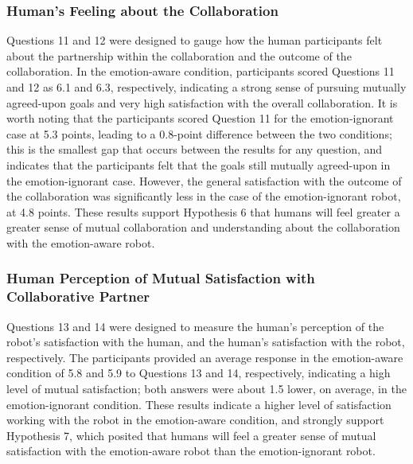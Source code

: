 \documentclass{sig-alternate-05-2015}
\begin{document}
\subsubsection{Human's Feeling about the Collaboration}
\label{sec:Collaboration}
Questions 11 and 12 were designed to gauge how the human participants felt
about the partnership within the collaboration and the outcome of the
collaboration. In the emotion-aware condition, participants scored Questions 11
and 12 as 6.1 and 6.3, respectively, indicating a strong sense of pursuing
mutually agreed-upon goals and very high satisfaction with the overall
collaboration. It is worth noting that the participants scored Question 11 for
the emotion-ignorant case at 5.3 points, leading to a 0.8-point difference
between the two conditions; this is the smallest gap that occurs between the
results for any question, and indicates that the participants felt that the
goals still mutually agreed-upon in the emotion-ignorant case. However, the
general satisfaction with the outcome of the collaboration was significantly
less in the case of the emotion-ignorant robot, at 4.8 points. These results
support Hypothesis 6 that humans will feel greater a greater sense of mutual
collaboration and understanding about the collaboration with the emotion-aware
robot.

\subsubsection{Human Perception of Mutual Satisfaction with Collaborative
Partner}
\label{sec:MutualSatisfaction}
Questions 13 and 14 were designed to measure the human's perception of the
robot's satisfaction with the human, and the human's satisfaction with the
robot, respectively. The participants provided an average response in the
emotion-aware condition of 5.8 and 5.9 to Questions 13 and 14, respectively,
indicating a high level of mutual satisfaction; both answers were about 1.5
lower, on average, in the emotion-ignorant condition. These results indicate a
higher level of satisfaction working with the robot in the emotion-aware
condition, and strongly support Hypothesis 7, which posited that humans will
feel a greater sense of mutual satisfaction with the emotion-aware robot than
the emotion-ignorant robot.
\end{document}

